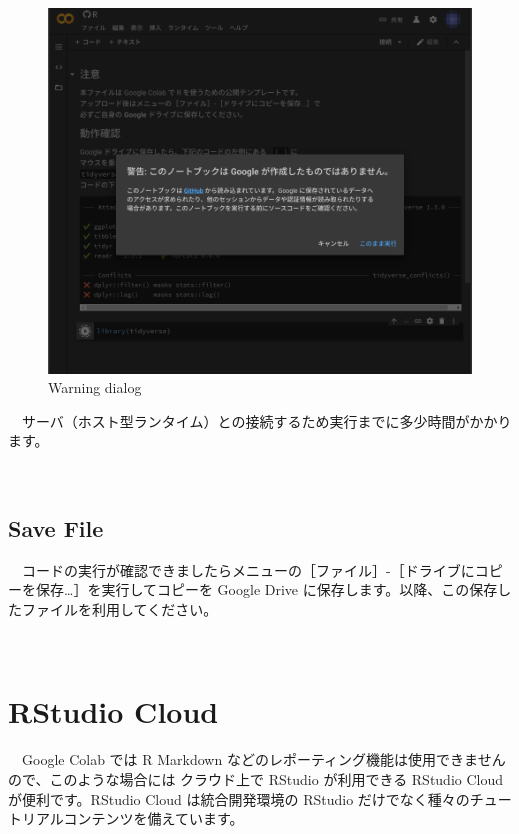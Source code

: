 \documentclass[
  12pt,
]{book}
\begin{document}
\begin{figure}[H]

{\centering \includegraphics[width=0.8\linewidth,]{fig/Colab/run_dialog} 

}

\caption{Warning dialog}\label{fig:unnamed-chunk-138}
\end{figure}

　サーバ（ホスト型ランタイム）との接続するため実行までに多少時間がかかります。

　

\hypertarget{save-file}{%
\subsection{Save File}\label{save-file}}

　コードの実行が確認できましたらメニューの［ファイル］-［ドライブにコピーを保存\ldots］を実行してコピーを Google Drive に保存します。以降、この保存したファイルを利用してください。

　

\hypertarget{rstudio-cloud-1}{%
\section{RStudio Cloud}\label{rstudio-cloud-1}}

　Google Colab では R Markdown などのレポーティング機能は使用できませんので、このような場合には クラウド上で RStudio が利用できる RStudio Cloud が便利です。RStudio Cloud は統合開発環境の RStudio だけでなく種々のチュートリアルコンテンツを備えています。\\
　\\
\end{document}
